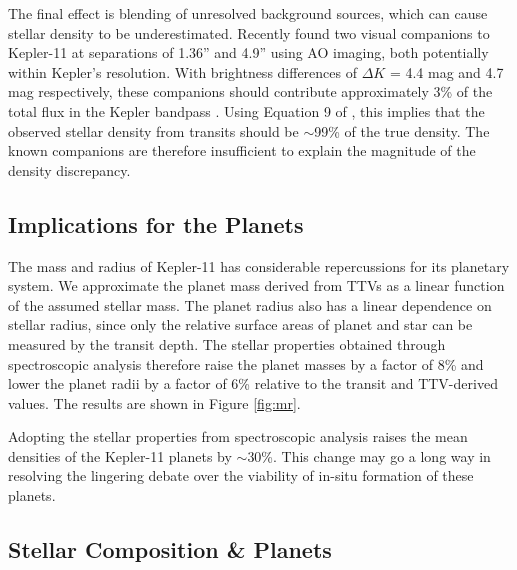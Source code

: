\documentclass[oneside]{emulateapj}
\begin{document}
The final effect is blending of unresolved background sources, which can cause stellar density to be underestimated. Recently \citet{Wang2015} found two visual companions to Kepler-11 at separations of 1.36'' and 4.9'' using AO imaging, both potentially within Kepler's resolution. With brightness differences of $\Delta K$ = 4.4 mag and 4.7 mag respectively, these companions should contribute approximately 3\% of the total flux in the Kepler bandpass . Using Equation 9 of \citet{Kipping2014}, this implies that the observed stellar density from transits should be $\sim$99\% of the true density. The known companions are therefore insufficient to explain the magnitude of the density discrepancy.


\subsection{Implications for the Planets}

The mass and radius of Kepler-11 has considerable repercussions for its planetary system. We approximate the planet mass derived from TTVs as a linear function of the assumed stellar mass. The planet radius also has a linear dependence on stellar radius, since only the relative surface areas of planet and star can be measured by the transit depth. The stellar properties obtained through spectroscopic analysis therefore raise the planet masses by a factor of 8\% and lower the planet radii by a factor of 6\% relative to the transit and TTV-derived values. The results are shown in Figure \ref{fig:mr}.

Adopting the stellar properties from spectroscopic analysis raises the mean densities of the Kepler-11 planets by $\sim$30\%. This change may go a long way in resolving the lingering debate over the viability of in-situ formation of these planets. 

\subsection{Stellar Composition \& Planets}

\end{document}
